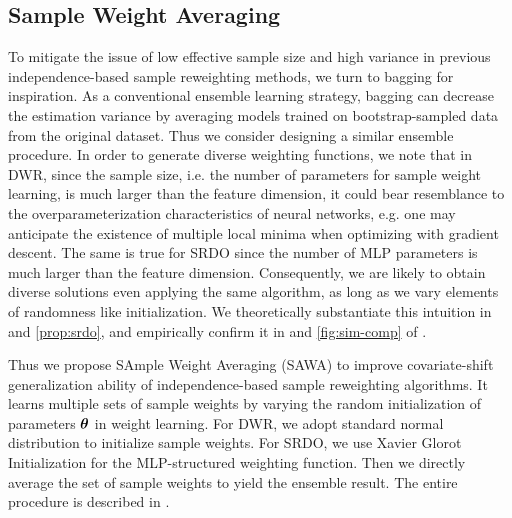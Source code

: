 

\subsection{Sample Weight Averaging}

To mitigate the issue of low effective sample size and high variance in previous independence-based sample reweighting methods, we turn to bagging for inspiration. 
As a conventional ensemble learning strategy, bagging can decrease the estimation variance by averaging models trained on bootstrap-sampled data from the original dataset. 
Thus we consider designing a similar ensemble procedure. 
In order to generate diverse weighting functions, we note that in DWR, since the sample size, i.e. the number of parameters for sample weight learning, is much larger than the feature dimension, it could bear resemblance to the overparameterization characteristics of neural networks, e.g. one may anticipate the existence of multiple local minima when optimizing with gradient descent. The same is true for SRDO since the number of MLP parameters is much larger than the feature dimension. 
Consequently, we are likely to obtain diverse solutions even applying the same algorithm, as long as we vary elements of randomness like initialization. 
We theoretically substantiate this intuition in  and \ref{prop:srdo}, and empirically confirm it in  and \ref{fig:sim-comp} of . 



Thus we propose SAmple Weight Averaging (SAWA) to improve covariate-shift generalization ability of independence-based sample reweighting algorithms. It learns multiple sets of sample weights by varying the random initialization of parameters $\boldsymbol{\theta}$ in weight learning. 
For DWR, we adopt standard normal distribution to initialize sample weights. For SRDO, we use Xavier Glorot Initialization \citep{glorot2010understanding} for the MLP-structured weighting function. 
Then we directly average the set of sample weights to yield the ensemble result. The entire procedure is described in .


